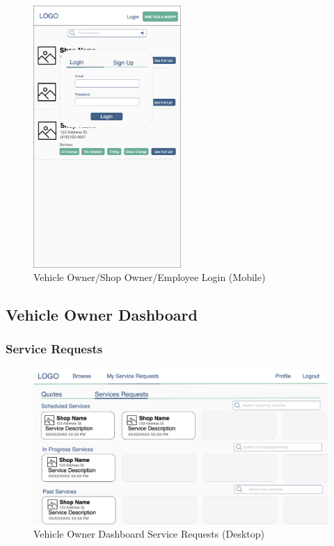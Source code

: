 \documentclass[12pt, titlepage]{article}
\begin{document}
\begin{figure}[H]
	\centering
	\includegraphics[width=0.5\textwidth]{mockups/Vehicle-Shop Owner Login Popup (Mobile).png}
	\caption{Vehicle Owner/Shop Owner/Employee Login (Mobile)}
\end{figure}

\subsection{Vehicle Owner Dashboard}
\subsubsection{Service Requests}

\begin{figure}[H]
	\centering
	\includegraphics[width=\textwidth]{mockups/Vehicle Owner Dashboard (Service Requests) (Desktop).png}
	\caption{Vehicle Owner Dashboard \textemdash{} Service Requests (Desktop)}
\end{figure}
\end{document}
